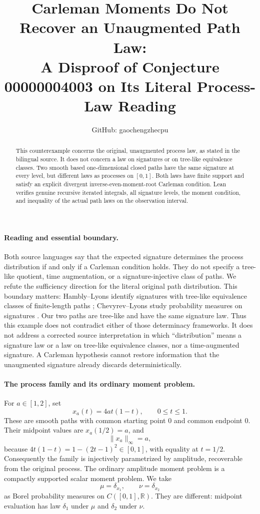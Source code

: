 \documentclass[11pt]{article}
\title{Carleman Moments Do Not Recover an Unaugmented Path Law:\\A Disproof of Conjecture 00000004003 on Its Literal Process-Law Reading}
\author{GitHub: gaochengzhecpu}
\date{}
\begin{document}
\maketitle
\begin{abstract}
This counterexample concerns the original, unaugmented process law,
as stated in the bilingual source. It does not concern a law on
signatures or on tree-like equivalence classes. Two smooth based
one-dimensional closed paths have the same signature at every level,
but different laws as processes on $[0,1]$. Both laws have finite support
and satisfy an explicit divergent inverse-even-moment-root Carleman
condition. Lean verifies genuine recursive iterated integrals, all
signature levels, the moment condition, and inequality of the actual
path laws on the observation interval.
\end{abstract}

\paragraph{Reading and essential boundary.}
Both source languages say that the expected signature determines the
process distribution if and only if a Carleman condition holds. They
do not specify a tree-like quotient, time augmentation, or a
signature-injective class of paths. We refute the sufficiency direction
for the literal original path distribution. This boundary matters:
Hambly--Lyons identify signatures with tree-like equivalence classes
of finite-length paths \cite{HL}; Chevyrev--Lyons study probability
measures on signatures \cite{CL}. Our two paths are tree-like and have
the same signature law. Thus this example does not contradict either
of those determinacy frameworks. It does not address a corrected
source interpretation in which ``distribution'' means a signature
law or a law on tree-like equivalence classes, nor a time-augmented
signature. A Carleman hypothesis cannot restore information that the
unaugmented signature already discards deterministically.

\paragraph{The process family and its ordinary moment problem.}
For $a\in[1,2]$, set
\[
 x_a(t)=4at(1-t),\qquad 0\le t\le1.
\]
These are smooth paths with common starting point $0$ and common
endpoint $0$. Their midpoint values are $x_a(1/2)=a$, and
\[
 \|x_a\|_\infty=a,
\]
because $4t(1-t)=1-(2t-1)^2\in[0,1]$, with equality at $t=1/2$.
Consequently the family is injectively parametrized by amplitude,
recoverable from the original process. The ordinary amplitude moment
problem is a compactly supported scalar moment problem. We take
\[
 \mu=\delta_{x_1},\qquad \nu=\delta_{x_2}
\]
as Borel probability measures on $C([0,1],\mathbb R)$. They are
different: midpoint evaluation has law $\delta_1$ under $\mu$ and
$\delta_2$ under $\nu$.
\end{document}
